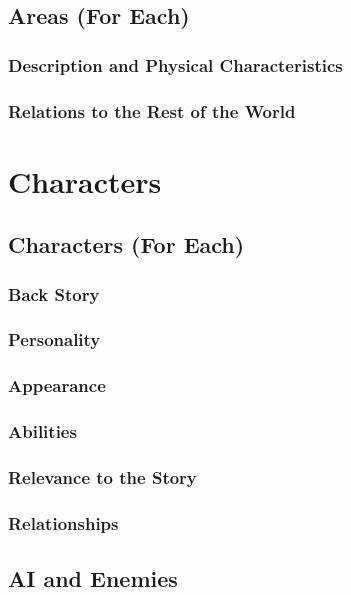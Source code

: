 \documentclass[12pt]{article}
\begin{document}
\subsection{Areas (For Each)}

\subsubsection{Description and Physical Characteristics}

\subsubsection{Relations to the Rest of the World}

\section{Characters}

\subsection{Characters (For Each)}

\subsubsection{Back Story}

\subsubsection{Personality}

\subsubsection{Appearance}

\subsubsection{Abilities}

\subsubsection{Relevance to the Story}

\subsubsection{Relationships}

\subsection{AI and Enemies}
\end{document}
